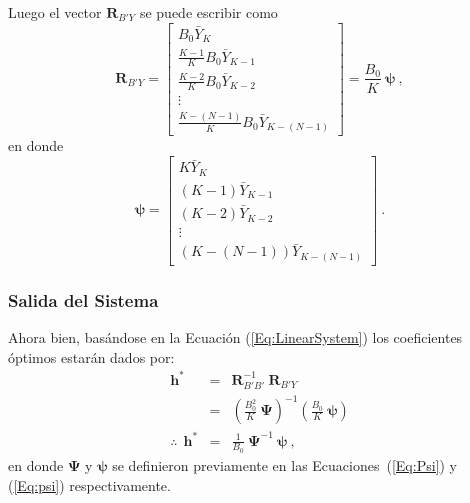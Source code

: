 \vspace{0.5cm}
Luego el vector $\bm{R}_{B'Y}$ se puede escribir como
\begin{equation}
 \bm{R}_{B'Y}=\left[\begin{array}{c}
 B_0\bar{Y}_{K}\\
 \frac{K-1}{K}B_0\bar{Y}_{K-1}\\
 \frac{K-2}{K}B_0\bar{Y}_{K-2}\\\vdots\\
 \frac{K-(N-1)}{K}B_0\bar{Y}_{K-(N-1)}\end{array}\right]
%
 = \frac{B_0}{K}~\bm{\psi}~,
\end{equation}
en donde
\begin{equation}
 \bm{\psi} = \left[\begin{array}{c}
 K\bar{Y}_{K}\\
 (K-1)\bar{Y}_{K-1}\\
 (K-2)\bar{Y}_{K-2}\\\vdots\\
 (K-(N-1))\bar{Y}_{K-(N-1)}\end{array}\right]~. \label{Eq:psi}
\end{equation}


\subsubsection{Salida del Sistema}
Ahora bien, basándose en la Ecuación (\ref{Eq:LinearSystem}) los coeficientes óptimos estarán dados por:
\begin{eqnarray}
 \nonumber \bm h^* &=& \bm{R}_{B'B'}^{-1} ~ \bm{R}_{B'Y}\\
 \nonumber &=&\left(\frac{B_0^2}{K}~\bm{\Psi}\right)^{-1}\left(\frac{B_0}{K}~\bm{\psi}\right)\\
 \therefore~~\bm h^* &=& \frac{1}{B_0}~\bm{\Psi}^{-1}~\bm{\psi}~,
\end{eqnarray}
en donde $\bm{\Psi}$ y $\bm{\psi}$ se definieron previamente en las Ecuaciones~(\ref{Eq:Psi}) y (\ref{Eq:psi}) respectivamente.

